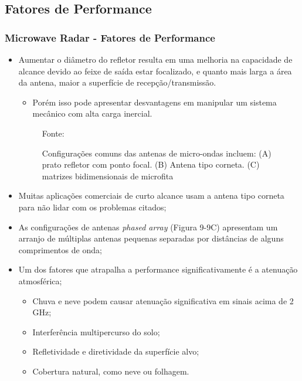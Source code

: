 \documentclass[xcolor=dvipsnames, aspectratio=169]{beamer}
\begin{document}
    \subsection[Fatores de Performance]{Fatores de Performance} 
    \begin{frame}
    \frametitle{Microwave Radar - Fatores de Performance}
        \begin{itemize}
            \item Aumentar o diâmetro do refletor resulta em uma melhoria na capacidade de alcance devido ao feixe de saída estar focalizado, e quanto mais larga a área da antena, maior a superfície de recepção/transmissão.
            \begin{itemize}
                \item Porém isso pode apresentar desvantagens em manipular um sistema mecânico com alta carga inercial.
            \end{itemize}
            		
		\begin{figure}
            \centering
            {Fonte: \cite{everett1995sensors}}
            \caption{Configurações comuns das antenas de micro-ondas incluem: (A) prato refletor com ponto focal. (B) Antena tipo corneta. (C) matrizes bidimensionais de microfita}
            \label{fig:MR_commom_config}
        \end{figure}
        
            \item Muitas aplicações comerciais de curto alcance usam a antena tipo corneta para não lidar com os problemas citados;
            \item As configurações de antenas \textit{phased array} (Figura 9-9C) apresentam um arranjo de múltiplas antenas pequenas separadas por distâncias de alguns comprimentos de onda;
            \item Um dos fatores que atrapalha a performance significativamente é a atenuação atmosférica;
            \begin{itemize}
                \item Chuva e neve podem causar atenuação significativa em sinais acima de 2 GHz;
                \item Interferência multipercurso do solo; 
                \item Refletividade e diretividade da superfície alvo;
                \item Cobertura natural, como neve ou folhagem.
            \end{itemize}
        \end{itemize}
    \end{frame}
\end{document}
